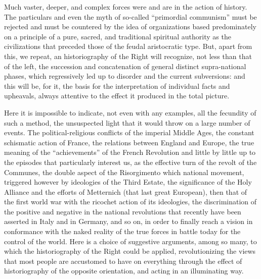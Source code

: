 Much vaster, deeper, and complex forces were and are in the action of history. The particulars and even the myth of so-called ``primordial communism'' must be rejected and must be countered by the idea of organizations based predominately on a principle of a pure, sacred, and traditional spiritual authority as the civilizations that preceded those of the feudal aristocratic type. But, apart from this, we repeat, an historiography of the Right will recognize, not less than that of the left, the succession and concatenation of general distinct supra-national phases, which regressively led up to disorder and the current subversions: and this will be, for it, the basis for the interpretation of individual facts and upheavals, always attentive to the effect it produced in the total picture.

Here it is impossible to indicate, not even with any examples, all the fecundity of such a method, the unsuspected light that it would throw on a large number of events. The political-religious conflicts of the imperial Middle Ages, the constant schismatic action of France, the relations between England and Europe, the true meaning of the ``achievements'' of the French Revolution and little by little up to the episodes that particularly interest us, as the effective turn of the revolt of the Communes, the double aspect of the Risorgimento which national movement, triggered however by ideologies of the Third Estate, the significance of the Holy Alliance and the efforts of Metternich (that last great European), then that of the first world war with the ricochet action of its ideologies, the discrimination of the positive and negative in the national revolutions that recently have been asserted in Italy and in Germany, and so on, in order to finally reach a vision in conformance with the naked reality of the true forces in battle today for the control of the world. Here is a choice of suggestive arguments, among so many, to which the historiography of the Right could be applied, revolutionizing the views that most people are accustomed to have on everything through the effect of historiography of the opposite orientation, and acting in an illuminating way.

